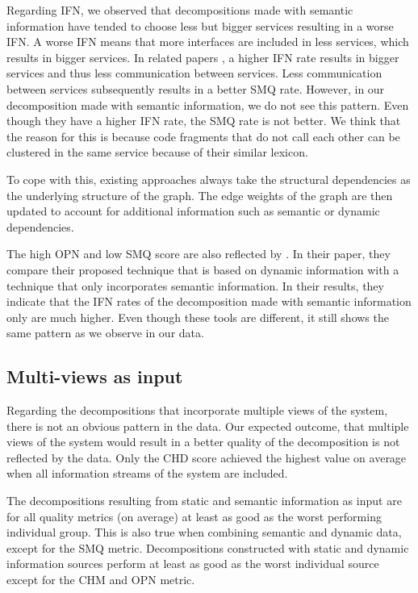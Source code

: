 Regarding IFN, we observed that decompositions made with semantic information have tended to choose less but bigger services resulting in a worse IFN. A worse IFN means that more interfaces are included in less services, which results in bigger services. In related papers \cite{brito2021identification}, a higher IFN rate results in bigger services and thus less communication between services. Less communication between services subsequently results in a better SMQ rate. However, in our decomposition made with semantic information, we do not see this pattern. Even though they have a higher IFN rate, the SMQ rate is not better. We think that the reason for this is because code fragments that do not call each other can be clustered in the same service because of their similar lexicon. \par

To cope with this, existing approaches \cite{brito2021identification, lohnertz2020steinmetz} always take the structural dependencies as the underlying structure of the graph. The edge weights of the graph are then updated to account for additional information such as semantic or dynamic dependencies. \par

The high OPN and low SMQ score are also reflected by \citeauthor{jin2019service} \cite{jin2019service}. In their paper, they compare their proposed technique that is based on dynamic information with a technique that only incorporates semantic information. In their results, they indicate that the IFN rates of the decomposition made with semantic information only are much higher. Even though these tools are different, it still shows the same pattern as we observe in our data. \par

\subsection{Multi-views as input}
Regarding the decompositions that incorporate multiple views of the system, there is not an obvious pattern in the data. Our expected outcome, that multiple views of the system would result in a better quality of the decomposition is not reflected by the data. Only the CHD score achieved the highest value on average when all information streams of the system are included.\par

The decompositions resulting from static and semantic information as input are for all quality metrics (on average) at least as good as the worst performing individual group. This is also true when combining semantic and dynamic data, except for the SMQ metric. Decompositions constructed with static and dynamic information sources perform at least as good as the worst individual source except for the CHM and OPN metric. \par

